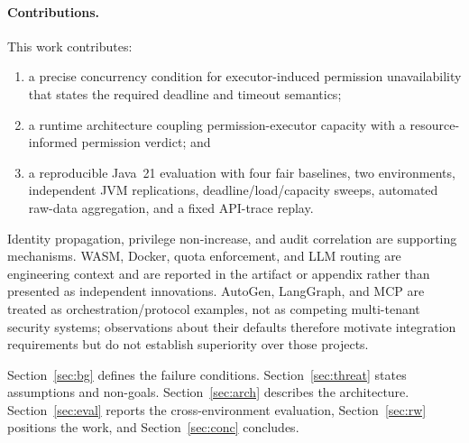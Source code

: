 \paragraph{Contributions.}
This work contributes:

\begin{enumerate}
  \item a precise concurrency condition for executor-induced permission
  unavailability that states the required deadline and timeout semantics;
  \item a runtime architecture coupling permission-executor capacity with a
  resource-informed permission verdict; and
  \item a reproducible Java~21 evaluation with four fair baselines, two
  environments, independent JVM replications, deadline/load/capacity sweeps,
  automated raw-data aggregation, and a fixed API-trace replay.
\end{enumerate}

Identity propagation, privilege non-increase, and audit correlation are
supporting mechanisms. WASM, Docker, quota enforcement, and LLM routing are
engineering context and are reported in the artifact or appendix rather than
presented as independent innovations. AutoGen, LangGraph, and MCP are treated
as orchestration/protocol examples, not as competing multi-tenant security
systems; observations about their defaults therefore motivate integration
requirements but do not establish superiority over those projects.

Section~\ref{sec:bg} defines the failure conditions. Section~\ref{sec:threat}
states assumptions and non-goals. Section~\ref{sec:arch} describes the
architecture. Section~\ref{sec:eval} reports the cross-environment
evaluation, Section~\ref{sec:rw} positions the work, and Section~\ref{sec:conc}
concludes.
